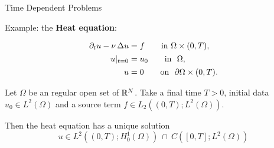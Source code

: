 \begin{frame}{Time Dependent Problems}
  \begin{small}
    Example: the \textbf{Heat equation}:
  \end{small}
  \begin{BlockNoTitle}%
    \begin{equation*}
        \begin{aligned}%
          \dt u - \nu\, \Delta u &= f
          \qquad \text{in} \ \Omega\times (0,T),
          \\[0.1em]
          u|_{t=0} &= u_0
          \qquad \text{in }\ \Omega,
          \\[0.1em]
          u&=0
          \qquad \text{on }\ \partial\Omega \times (0,T).
        \end{aligned}
      \end{equation*}
  \end{BlockNoTitle}
  \begin{theorem}
    Let $\Omega$ be an regular open set of ${\mathbb R}^N$. Take a final
    time $T>0$, initial data $u_0\in L^2(\Omega)$ and a source term
    $f\in L_2( (0,T); L^2(\Omega))$.
    \par\medskip
    Then \alert{the heat equation has a unique solution}
    $$
    u\in L^2( (0,T); H_0^1(\Omega)) \ \cap \ C([0,T];L^2(\Omega))
    $$
  \end{theorem}
\end{frame}


